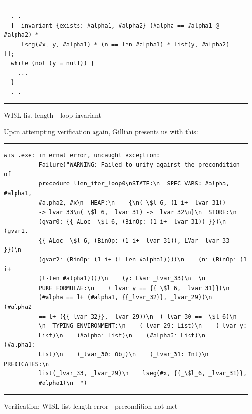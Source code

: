 \begin{listing}[!ht]
\noindent\rule{\textwidth}{0.5pt}
\vspace{-0.6cm}
\begin{verbatim}
  ...
  [[ invariant {exists: #alpha1, #alpha2} (#alpha == #alpha1 @ #alpha2) * 
     lseg(#x, y, #alpha1) * (n == len #alpha1) * list(y, #alpha2)         ]];
  while (not (y = null)) {
    ...
  }
  ...
\end{verbatim}
\vspace{-0.4cm}
\noindent\rule{\textwidth}{0.5pt}
\vspace{-0.6cm}
\caption{WISL list length - loop invariant}
\end{listing}

Upon attempting verification again, Gillian presents us with this:
\begin{listing}[!ht]
\noindent\rule{\textwidth}{0.5pt}
\vspace{-0.6cm}
\begin{verbatim}
wisl.exe: internal error, uncaught exception:
          Failure("WARNING: Failed to unify against the precondition of
          procedure llen_iter_loop0\nSTATE:\n  SPEC VARS: #alpha, #alpha1,
          #alpha2, #x\n  HEAP:\n    {\n(_\$l_6, (1 i+ _lvar_31))
          ->_lvar_33\n(_\$l_6, _lvar_31) -> _lvar_32\n}\n  STORE:\n    
          (gvar0: {{ ALoc _\$l_6, (BinOp: (1 i+ _lvar_31)) }})\n    (gvar1:
          {{ ALoc _\$l_6, (BinOp: (1 i+ _lvar_31)), LVar _lvar_33 }})\n    
          (gvar2: (BinOp: (1 i+ (l-len #alpha1))))\n    (n: (BinOp: (1 i+
          (l-len #alpha1))))\n    (y: LVar _lvar_33)\n  \n  
          PURE FORMULAE:\n    (_lvar_y == {{_\$l_6, _lvar_31}})\n    
          (#alpha == l+ (#alpha1, {{_lvar_32}}, _lvar_29))\n    (#alpha2 
          == l+ ({{_lvar_32}}, _lvar_29))\n  (_lvar_30 == _\$l_6)\n  
          \n  TYPING ENVIRONMENT:\n    (_lvar_29: List)\n    (_lvar_y:
          List)\n    (#alpha: List)\n    (#alpha2: List)\n    (#alpha1:
          List)\n    (_lvar_30: Obj)\n    (_lvar_31: Int)\n  PREDICATES:\n    
          list(_lvar_33, _lvar_29)\n    lseg(#x, {{_\$l_6, _lvar_31}}, 
          #alpha1)\n  ")
\end{verbatim}
\vspace{-0.4cm}
\noindent\rule{\textwidth}{0.5pt}
\vspace{-0.6cm}
\caption{Verification: WISL list length error - precondition not met}
\end{listing}

